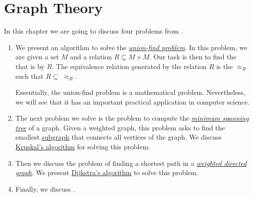 \chapter{Graph Theory}
In this chapter we are going to discuss four problems from .
\begin{enumerate}
\item We present an algorithm to solve the 
      \href{https://en.wikipedia.org/wiki/Disjoint-set_data_structure}{\emph{union-find problem}}.
      In this problem, we are given a set $M$ and a relation $R \subseteq M \times M$.  Our task is
      then to find the  that is  by $R$.  The equivalence relation
      generated by the relation $R$ is the  $\approx_R$ such that $R \subseteq\; \approx_R$.
      
      Essentially, the union-find problem is a mathematical problem.  Nevertheless, we will see that 
      it has an important practical application in computer science. 
\item The next problem we solve is the problem to compute the
      \href{https://en.wikipedia.org/wiki/Minimum_spanning_tree}{\emph{minimum spanning tree}}
      of a graph.  Given a weighted graph, this problem asks to find the smallest 
      \href{https://en.wikipedia.org/wiki/Glossary_of_graph_theory_terms#subgraph}{subgraph} that 
      connects all vertices of the graph.  We discuss
      \href{https://en.wikipedia.org/wiki/Kruskal%27s_algorithm}{Kruskal's algorithm} 
      for solving this problem.  
\item Then we discuss the problem of finding a shortest path in a 
      \href{https://en.wikipedia.org/wiki/Directed_graph}{\emph{weighted directed graph}}.
      We present \href{https://en.wikipedia.org/wiki/Dijkstra%27s_algorithm}{Dijkstra's algorithm} to solve
      this problem.   
\item Finally, we discuss .
\end{enumerate}

